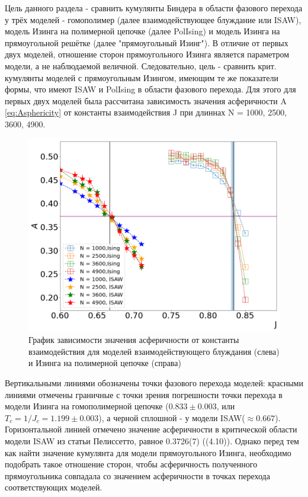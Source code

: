 Цель данного раздела - сравнить кумулянты Биндера в области фазового перехода у трёх моделей - гомополимер (далее взаимодействующее блуждание или ISAW), модель Изинга на полимерной цепочке (далее PolIsing) и модель Изинга на прямоугольной решётке (далее "прямоугольный Изинг"). В отличие от первых двух моделей, отношение сторон прямоугольного Изинга является параметром модели, а не наблюдаемой величной. Следовательно, цель - сравнить крит. кумулянты моделей с прямоугольным Изингом, имеющим те же показатели формы, что имеют ISAW и PolIsing в области фазового перехода. 
Для этого для первых двух моделей была рассчитана зависимость значения асферичности A \eqref{eq:Asphericity} от константы взаимодействия J при длиннах N = 1000, 2500, 3600, 4900.
\newpage
\begin{figure}[h!]
    \centering
    \includegraphics[width=150mm]{Sections/Images/Ising_ISAW_A_J_Full.png}
    \caption{График зависимости значения асферичности от константы взаимодействия для моделей взаимодействующего блуждания (слева) и Изинга на полимерной цепочке (справа)}
    \label{fig:A_J}
\end{figure}

Вертикальными линиями обозначены точки фазового перехода моделей: красными линиями отмечены граничные с точки зрения погрешности точки перехода в модели Изинга на гомополимерной цепочке ($0.833 \pm 0.003$, или $T_{c}=1/J_{c} = 1.199\pm0.003$\cite{foster2021critical}), а черной сплошной - у модели ISAW($\approx 0.667$\cite{caracciolo2011geometrical}). Горизонтальной линией отмечено значение асферичности в критической области модели ISAW из статьи Пелиссетто, равное 0.3726(7) ((4.10)\cite{caracciolo2011geometrical}). Однако перед тем как найти значение кумулянта для модели прямоугольного Изинга, необходимо подобрать такое отношение сторон, чтобы асферичность полученного прямоугольника совпадала со значением асферичности в точках перехода соответствующих моделей.

